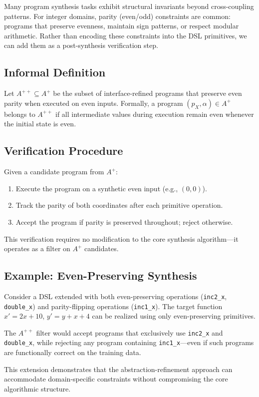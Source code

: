 \documentclass[11pt]{article}
\begin{document}
Many program synthesis tasks exhibit structural invariants beyond cross-coupling patterns. For integer domains, parity (even/odd) constraints are common: programs that preserve evenness, maintain sign patterns, or respect modular arithmetic. Rather than encoding these constraints into the DSL primitives, we can add them as a post-synthesis verification step.

\subsection{Informal Definition}

Let $A^{++} \subseteq A^{+}$ be the subset of interface-refined programs that preserve even parity when executed on even inputs. Formally, a program $(p_X, \alpha) \in A^{+}$ belongs to $A^{++}$ if all intermediate values during execution remain even whenever the initial state is even.

\subsection{Verification Procedure}

Given a candidate program from $A^{+}$:
\begin{enumerate}
    \item Execute the program on a synthetic even input (e.g., $(0,0)$).
    \item Track the parity of both coordinates after each primitive operation.
    \item Accept the program if parity is preserved throughout; reject otherwise.
\end{enumerate}

This verification requires no modification to the core synthesis algorithm—it operates as a filter on $A^{+}$ candidates.

\subsection{Example: Even-Preserving Synthesis}

Consider a DSL extended with both even-preserving operations (\texttt{inc2\_x}, \texttt{double\_x}) and parity-flipping operations (\texttt{inc1\_x}). The target function $x' = 2x + 10$, $y' = y + x + 4$ can be realized using only even-preserving primitives.

The $A^{++}$ filter would accept programs that exclusively use \texttt{inc2\_x} and \texttt{double\_x}, while rejecting any program containing \texttt{inc1\_x}—even if such programs are functionally correct on the training data.

This extension demonstrates that the abstraction-refinement approach can accommodate domain-specific constraints without compromising the core algorithmic structure.
\end{document}
